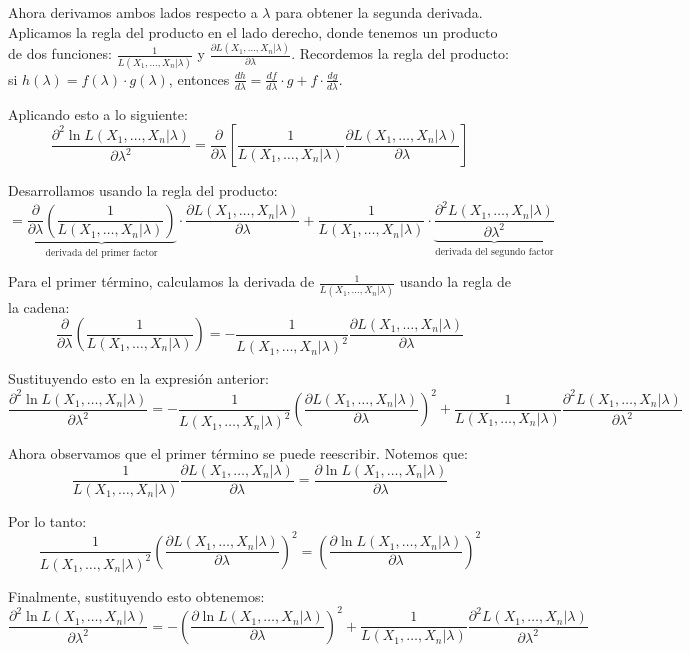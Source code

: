 \documentclass[
  11pt,
  letterpaper,
   addpoints,
   answers
  ]{exam}
\begin{document}
\begin{questions}
\begin{parts}
\begin{solution}
Ahora derivamos ambos lados respecto a $\lambda$ para obtener la segunda derivada. Aplicamos la regla del producto en el lado derecho, donde tenemos un producto de dos funciones: $\frac{1}{L(X_1, \ldots, X_n|\lambda)}$ y $\frac{\partial L(X_1, \ldots, X_n|\lambda)}{\partial \lambda}$. Recordemos la regla del producto: si $h(\lambda) = f(\lambda) \cdot g(\lambda)$, entonces $\frac{dh}{d\lambda} = \frac{df}{d\lambda} \cdot g + f \cdot \frac{dg}{d\lambda}$.

Aplicando esto a lo siguiente:
\[
\frac{\partial^2 \ln L(X_1, \ldots, X_n|\lambda)}{\partial \lambda^2} = \frac{\partial}{\partial \lambda}\left[\frac{1}{L(X_1, \ldots, X_n|\lambda)}\frac{\partial L(X_1, \ldots, X_n|\lambda)}{\partial \lambda}\right]
\]

Desarrollamos usando la regla del producto:
\[
= \underbrace{\frac{\partial}{\partial \lambda}\left(\frac{1}{L(X_1, \ldots, X_n|\lambda)}\right)}_{\text{derivada del primer factor}} \cdot \frac{\partial L(X_1, \ldots, X_n|\lambda)}{\partial \lambda} + \frac{1}{L(X_1, \ldots, X_n|\lambda)} \cdot \underbrace{\frac{\partial^2 L(X_1, \ldots, X_n|\lambda)}{\partial \lambda^2}}_{\text{derivada del segundo factor}}
\]

Para el primer término, calculamos la derivada de $\frac{1}{L(X_1, \ldots, X_n|\lambda)}$ usando la regla de la cadena:
\[
\frac{\partial}{\partial \lambda}\left(\frac{1}{L(X_1, \ldots, X_n|\lambda)}\right) = -\frac{1}{L(X_1, \ldots, X_n|\lambda)^2}\frac{\partial L(X_1, \ldots, X_n|\lambda)}{\partial \lambda}
\]

Sustituyendo esto en la expresión anterior:
\[
\frac{\partial^2 \ln L(X_1, \ldots, X_n|\lambda)}{\partial \lambda^2} = -\frac{1}{L(X_1, \ldots, X_n|\lambda)^2}\left(\frac{\partial L(X_1, \ldots, X_n|\lambda)}{\partial \lambda}\right)^2 + \frac{1}{L(X_1, \ldots, X_n|\lambda)}\frac{\partial^2 L(X_1, \ldots, X_n|\lambda)}{\partial \lambda^2}
\]

Ahora observamos que el primer término se puede reescribir. Notemos que:
\[
\frac{1}{L(X_1, \ldots, X_n|\lambda)}\frac{\partial L(X_1, \ldots, X_n|\lambda)}{\partial \lambda} = \frac{\partial \ln L(X_1, \ldots, X_n|\lambda)}{\partial \lambda}
\]

Por lo tanto:
\[
\frac{1}{L(X_1, \ldots, X_n|\lambda)^2}\left(\frac{\partial L(X_1, \ldots, X_n|\lambda)}{\partial \lambda}\right)^2 = \left(\frac{\partial \ln L(X_1, \ldots, X_n|\lambda)}{\partial \lambda}\right)^2
\]

Finalmente, sustituyendo esto obtenemos:
\[
\boxed{\frac{\partial^2 \ln L(X_1, \ldots, X_n|\lambda)}{\partial \lambda^2} = -\left(\frac{\partial \ln L(X_1, \ldots, X_n|\lambda)}{\partial \lambda}\right)^2 + \frac{1}{L(X_1, \ldots, X_n|\lambda)}\frac{\partial^2 L(X_1, \ldots, X_n|\lambda)}{\partial \lambda^2}}
\]


\end{solution}
\end{parts}
\end{questions}
\end{document}
